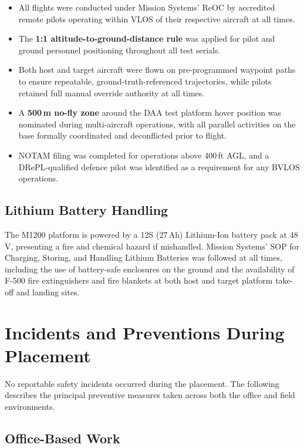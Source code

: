 \begin{itemize}
    \item All flights were conducted under Mission Systems' ReOC by accredited remote pilots
    operating within VLOS of their respective aircraft at all times.
    \item The \textbf{1:1 altitude-to-ground-distance rule} was applied for pilot and ground
    personnel positioning throughout all test serials.
    \item Both host and target aircraft were flown on pre-programmed waypoint paths to ensure
    repeatable, ground-truth-referenced trajectories, while pilots retained full manual
    override authority at all times.
    \item A \textbf{500\,m no-fly zone} around the DAA test platform hover position was
    nominated during multi-aircraft operations, with all parallel activities on the base
    formally coordinated and deconflicted prior to flight.
    \item NOTAM filing was completed for operations above 400\,ft AGL, and a DRePL-qualified
    defence pilot was identified as a requirement for any BVLOS operations.
\end{itemize}
 
\subsection*{Lithium Battery Handling}
 
The M1200 platform is powered by a 12S (27\,Ah) Lithium-Ion battery pack at 48\,V,
presenting a fire and chemical hazard if mishandled. Mission Systems' SOP for Charging,
Storing, and Handling Lithium Batteries was followed at all times, including the use of
battery-safe enclosures on the ground and the availability of F-500 fire extinguishers and
fire blankets at both host and target platform take-off and landing sites.
 
\section*{Incidents and Preventions During Placement}
 
No reportable safety incidents occurred during the placement. The following describes the
principal preventive measures taken across both the office and field environments.
 
\subsection*{Office-Based Work}
 
